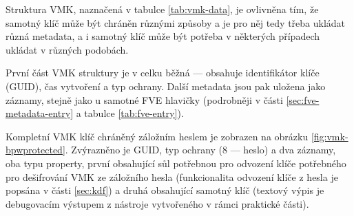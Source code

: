 Struktura VMK, naznačená v tabulce \ref{tab:vmk-data}, je ovlivněna tím, že samotný klíč může být chráněn různými způsoby a je pro něj tedy třeba ukládat různá metadata, a i samotný klíč může být potřeba v některých případech ukládat v různých podobách.

První část VMK struktury je v celku běžná --- obsahuje identifikátor klíče (GUID), čas vytvoření a typ ochrany. Další metadata jsou pak uložena jako záznamy, stejně jako u samotné FVE hlavičky (podrobněji v části \ref{sec:fve-metadata-entry} a tabulce \ref{tab:fve-entry}).


Kompletní VMK klíč chráněný záložním heslem je zobrazen na obrázku \ref{fig:vmk-bpwprotected}. Zvýrazněno je GUID, typ ochrany (8 --- heslo) a dva  záznamy, oba typu property, první obsahující sůl potřebnou pro odvození klíče potřebného pro dešifrování VMK ze záložního hesla (funkcionalita odvození klíče z hesla je popsána v části \ref{sec:kdf}) a druhá obsahující samotný klíč (textový výpis je debugovacím výstupem z nástroje vytvořeného v rámci praktické části).

